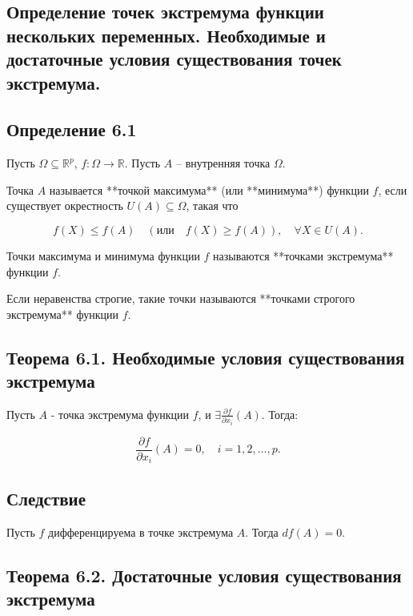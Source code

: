 {
\subsection{Определение точек экстремума функции нескольких переменных. Необходимые и достаточные условия существования точек экстремума.}

\subsection*{Определение 6.1}

Пусть \( \Omega \subseteq \mathbb{R}^p \), \( f: \Omega \to \mathbb{R} \). Пусть \( A \) – внутренняя точка \( \Omega \).

Точка \( A \) называется **точкой максимума** (или **минимума**) функции \( f \), если существует окрестность \( U(A) \subseteq \Omega \), такая что



\[
f(X) \leq f(A) \quad (\text{или} \quad f(X) \geq f(A)), \quad \forall X \in U(A).
\]



Точки максимума и минимума функции \( f \) называются **точками экстремума** функции \( f \).

Если неравенства строгие, такие точки называются **точками строгого экстремума** функции \( f \).

\subsection*{Теорема 6.1. Необходимые условия существования экстремума}

Пусть \( A \) - точка экстремума функции \( f \), и \( \exists \frac{\partial f}{\partial x_i} (A) \). Тогда:



\[
\frac{\partial f}{\partial x_i} (A) = 0, \quad i = 1, 2, \dots, p.
\]


\subsection*{Следствие}

Пусть \( f \) дифференцируема в точке экстремума \(A\). Тогда \(d f (A) = 0\).

\subsection*{Теорема 6.2. Достаточные условия существования экстремума}

}

